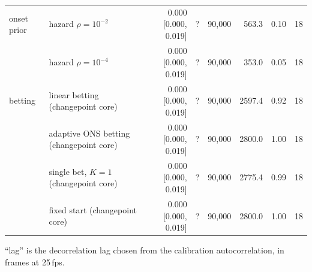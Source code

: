 \begin{table}[t]
{\begin{tabular}{llrcrrrr}
onset prior & hazard $\rho=10^{-2}$ & 0.000 [0.000, 0.019] & ? & 90,000 & 563.3 & 0.10 & 18 \\
 & hazard $\rho=10^{-4}$ & 0.000 [0.000, 0.019] & ? & 90,000 & 353.0 & 0.05 & 18 \\
betting & linear betting (changepoint core) & 0.000 [0.000, 0.019] & ? & 90,000 & 2597.4 & 0.92 & 18 \\
 & adaptive ONS betting (changepoint core) & 0.000 [0.000, 0.019] & ? & 90,000 & 2800.0 & 1.00 & 18 \\
 & single bet, $K=1$ (changepoint core) & 0.000 [0.000, 0.019] & ? & 90,000 & 2775.4 & 0.99 & 18 \\
 & fixed start (changepoint core) & 0.000 [0.000, 0.019] & ? & 90,000 & 2800.0 & 1.00 & 18 \\
\bottomrule
\end{tabular}}
\begin{minipage}{\linewidth}\vspace{2pt}\footnotesize ``lag'' is the decorrelation lag chosen from the calibration autocorrelation, in frames at 25\,fps.\end{minipage}
\end{table}
